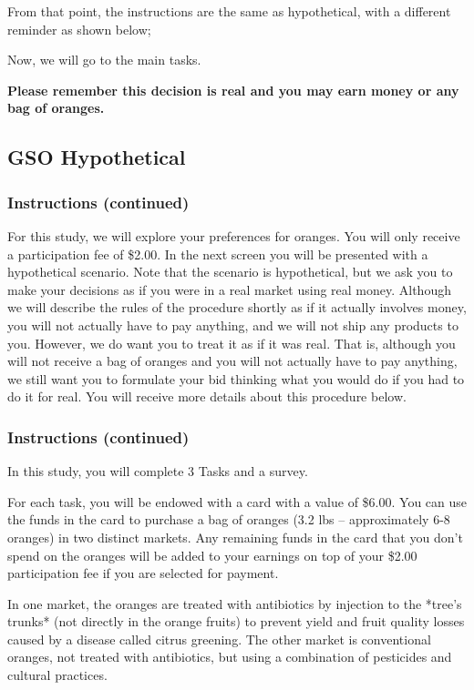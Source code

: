 \documentclass[12pt]{article}
\begin{document}
From that point, the instructions are the same as hypothetical, with a different reminder as shown below;

 Now, we will go to the main tasks.


\textbf{Please remember this decision is real and you may earn money or any bag of oranges.}

 \clearpage

 \subsection{GSO Hypothetical}
 \subsubsection*{\textbf{Instructions (continued)}}

For this study, we will explore your preferences for oranges. You will only receive a participation fee of \$2.00. In the next screen you will be presented with a hypothetical scenario. Note that the scenario is hypothetical, but we ask you to make your decisions as if you were in a real market using real money. Although we will describe the rules of the procedure shortly as if it actually involves money, you will not actually have to pay anything, and we will not ship any products to you. However, we do want you to treat it as if it was real. That is, although you will not receive a bag of oranges and you will not actually have to pay anything, we still want you to formulate your bid thinking what you would do if you had to do it for real. You will receive more details about this procedure below.


\clearpage

\subsubsection*{\textbf{Instructions (continued)}}

In this study, you will complete 3 Tasks and a survey.

For each task, you will be endowed with a card with a value of \$6.00. You can use the funds in the card to purchase a bag of oranges (3.2 lbs – approximately 6-8 oranges) in two distinct markets. Any remaining funds in the card that you don’t spend on the oranges will be added to your earnings on top of your \$2.00 participation fee if you are selected for payment.

In one market, the oranges are treated with antibiotics by injection to the *tree’s trunks* (not directly in the orange fruits) to prevent yield and fruit quality losses caused by a disease called citrus greening. The other market is conventional oranges, not treated with antibiotics, but using a combination of pesticides and cultural practices.
\end{document}
